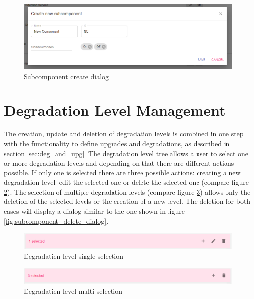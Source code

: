 \begin{figure}[ht]
    \centering
    \includegraphics[width=\textwidth]{img/subcomponents_create.png}
    \caption{Subcomponent create dialog}
    \label{fig:subcomponent_create_dialog}
\end{figure}

\section{Degradation Level Management}
The creation, update and deletion of degradation levels is combined in one step with the functionality to define upgrades and degradations, as described in section \ref{sec:deg_and_upg}. The degradation level tree allows a user to select one or more degradation levels and depending on that there are different actions possible. If only one is selected there are three possible actions: creating a new degradation level, edit the selected one or delete the selected one (compare figure \ref{fig:degradation_crud_level_single}). The selection of multiple degradation levels (compare figure \ref{fig:degradation_crud_level_multi}) allows only the deletion of the selected levels or the creation of a new level. The deletion for both cases will display a dialog similar to the one shown in figure \ref{fig:subcomponent_delete_dialog}.

\begin{figure}[ht]
    \centering
    \includegraphics[width=\textwidth]{img/degradation_level_crud_single.PNG}
    \caption{Degradation level single selection}
    \label{fig:degradation_crud_level_single}
\end{figure}

\begin{figure}[ht]
    \centering
    \includegraphics[width=\textwidth]{img/degradation_level_crud_multi.PNG}
    \caption{Degradation level multi selection}
    \label{fig:degradation_crud_level_multi}
\end{figure}

